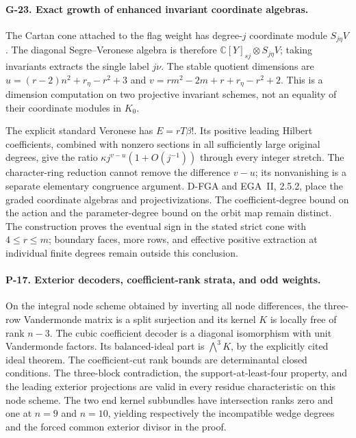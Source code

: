 \paragraph{G-23. Exact growth of enhanced invariant coordinate algebras.}
The Cartan cone attached to the flag weight has degree-$j$
coordinate module $S_{j\eta}V$. The diagonal Segre--Veronese
algebra is therefore
$\mathbb C[Y]_{sj}\otimes S_{j\eta}V$; taking invariants
extracts the single label $j\nu$. The stable quotient dimensions
are $u=(r-2)n^2+r_\eta-r^2+3$ and
$v=rm^2-2m+r+r_\eta-r^2+2$. This is a dimension computation
on two projective invariant schemes, not an equality of their
coordinate modules in $K_0$.

The explicit standard Veronese has $E=rT\beta!$.
Its positive leading Hilbert coefficients, combined with
nonzero sections in all sufficiently large original degrees,
give the ratio $\kappa j^{v-u}(1+O(j^{-1}))$ through every
integer stretch. The character-ring reduction cannot remove
the difference $v-u$; its nonvanishing is a separate elementary
congruence argument. D-FGA and EGA~II, 2.5.2, place the graded
coordinate algebras and projectivizations. The coefficient-degree
bound on the action and the parameter-degree bound on the orbit
map remain distinct. The construction proves the eventual sign
in the stated strict cone with $4\le r\le m$; boundary faces,
more rows, and effective positive extraction at individual
finite degrees remain outside this conclusion.

\paragraph{P-17. Exterior decoders, coefficient-rank strata, and odd weights.}
On the integral node scheme obtained by inverting all node
differences, the three-row Vandermonde matrix is a split
surjection and its kernel $K$ is locally free of rank $n-3$.
The cubic coefficient decoder is a diagonal isomorphism with
unit Vandermonde factors. Its balanced-ideal part is
$\bigwedge^3 K$, by the explicitly cited ideal theorem.
The coefficient-cut rank bounds are determinantal closed
conditions. The three-block contradiction, the support-at-least-four
property, and the leading exterior projections are valid in
every residue characteristic on this node scheme. The two end
kernel subbundles have intersection ranks zero and one at
$n=9$ and $n=10$, yielding respectively the incompatible wedge
degrees and the forced common exterior divisor in the proof.

